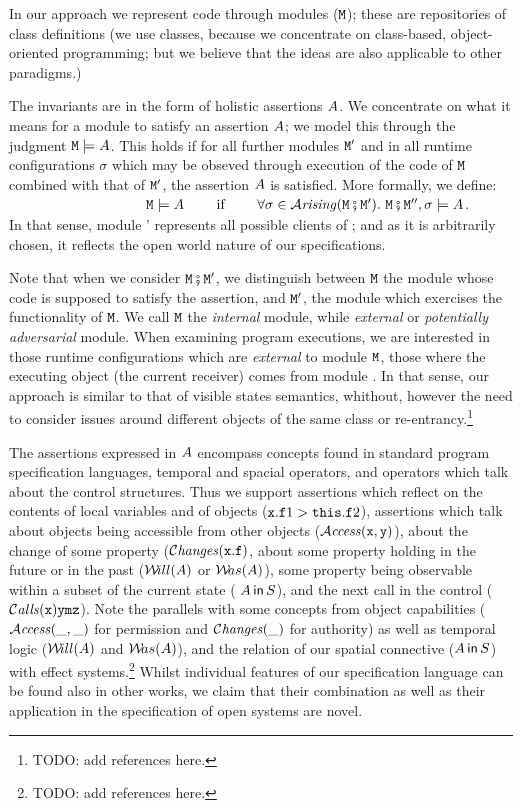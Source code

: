 In our approach we represent code through modules (${\mbox{\tt{\ensuremath{{\mbox{\tt{M}}}}}}}$); these are repositories of class definitions (we use classes, because we concentrate on class-based, object-oriented programming; but we believe that the ideas are also applicable to other paradigms.) 

The invariants are in the form of holistic assertions $A$. We concentrate on what it means for a module to satisfy an assertion $A$; we model this through the judgment ${\mbox{\tt{\ensuremath{{\mbox{\tt{M}}}}}}} \models A$.
This holds if for all further modules ${\mbox{\tt{\ensuremath{{\mbox{\tt{M}}}}}}}'$ and in  all runtime configurations $\sigma$ which may be obseved through execution of the code of ${\mbox{\tt{\ensuremath{{\mbox{\tt{M}}}}}}}$ combined with that of ${\mbox{\tt{\ensuremath{{\mbox{\tt{M}}}}}}}'$, the assertion $A$ is satisfied. More formally, we define:\\
$~ \strut  \hspace{1.3in} \M \models \A \ \ \  \ \ \ \mbox{             if               } \ \ \  \ \ \   \forall \sigma\in\Arising {\M \mkpair  {\M'}}. \ \M \mkpair  {\M''}, \sigma \models \A$.\\
 In that sense, module {\M'}  represents all possible clients of {\M}; and as it is arbitrarily chosen, it reflects the open world nature of our specifications.

Note that when we consider ${\mbox{\tt{\ensuremath{{\mbox{\tt{M}}}}}}} \fatsemi  {{\mbox{\tt{\ensuremath{{\mbox{\tt{M}}}}}}}'}$, we distinguish between ${\mbox{\tt{\ensuremath{{\mbox{\tt{M}}}}}}}$ the module 
whose code  is supposed to satisfy the assertion, and ${\mbox{\tt{\ensuremath{{\mbox{\tt{M}}}}}}}'$, the module which exercises 
the functionality of ${\mbox{\tt{\ensuremath{{\mbox{\tt{M}}}}}}}$. We call ${\mbox{\tt{\ensuremath{{\mbox{\tt{M}}}}}}}$ the {\em internal} module, while {\em external} 
or {\em potentially adversarial} module. When examining program executions, we are interested
 in those runtime configurations which are {\em external} to module ${\mbox{\tt{\ensuremath{{\mbox{\tt{M}}}}}}}$, \ie those where the 
 executing object (\ie the current receiver) comes from module \M.
 In  that sense, our approach is similar to that of visible states semantics, whithout, however the need to consider issues
around different objects of the same class or re-entrancy.\footnote{TODO: add references here.}

The assertions expressed in $A$  encompass concepts found in
 standard program specification languages, temporal and spacial operators, and operators which talk about the control structures. 
Thus we support assertions which reflect on the contents of local variables 
 and of objects  (\eg ${\mbox{\tt{x}}}.{\mbox{\tt{f}}}1 > {\mbox{\tt{this}}}.{\mbox{\tt{f}}}2$), assertions which talk about objects being accessible from other objects 
(\eg ${\mathcal{A}}\textrm{\textit{ccess}}({\mbox{\tt{x}}},{\mbox{\tt{y}}})$), about the change of some property 
(\eg $\mathcal{C}\textrm{\textit{hanges}}({\mbox{\tt{x}}}.{\mbox{\tt{f}}})$, about some property   holding in the future   or in the past
(\eg ${{\mathcal W}\!ill}(A)$  or ${{\mathcal W}\!as}(A)$), some property being observable within a subset of the current state
( $A\,{\bf{\sf {in}}}\, S$), and the next call in the control (${\mathcal{C}}\textrm{\textit{alls}}({\mbox{\tt{{\mbox{\tt{x}}}}}}) {{\mbox{\tt{y}}}} {{\mbox{\tt{m}}}} {{{\mbox{\tt{z}}}}}$). Note the parallels with 
some concepts from object capabilities (${\mathcal{A}}\textrm{\textit{ccess}}(\_,\_)$  for  permission and $\mathcal{C}\textrm{\textit{hanges}}(\_)$ for authority)
as well as temporal logic (${{\mathcal W}\!ill}(A)$  and ${{\mathcal W}\!as}(A)$), and the relation of
our spatial connective ($A\,{\bf{\sf {in}}}\, S$)  with effect systems.\footnote{TODO: add references here.}  Whilst   individual 
features of our specification language can  be found also in other works, we claim that their  combination as well as
their application in the specification of open systems are novel.

